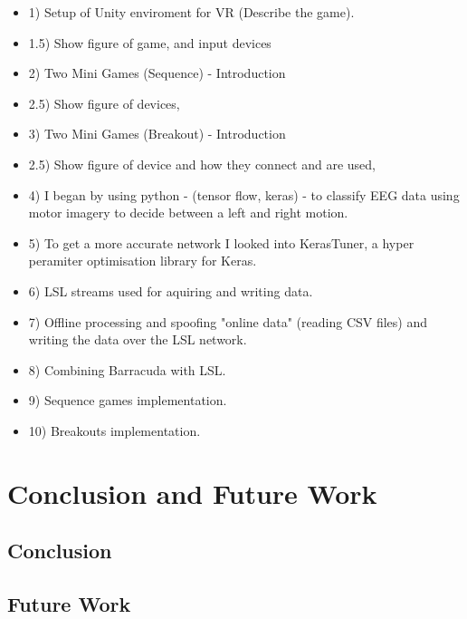 \documentclass[11pt, a4paper]{article}
\begin{document}
\break
\begin{itemize}
  \item 1)	Setup of Unity enviroment for VR (Describe the game).
  \item 1.5) Show figure of game, and input devices
  \item 2)	Two Mini Games (Sequence) - Introduction
  \item 2.5) Show figure of devices,
  \item 3)	Two Mini Games (Breakout) - Introduction
  \item 2.5) Show figure of device and how they connect and are used,
  \item 4)	I began by using python - (tensor flow, keras) - to classify EEG data using motor imagery to decide between a left and right motion.
  \item 5)	To get a more accurate network I looked into KerasTuner, a hyper peramiter optimisation library for Keras.
  \item 6)	LSL streams used for aquiring and writing data.
  \item 7)	Offline processing and spoofing "online data" (reading CSV files) and writing the data over the LSL network.
  \item 8)	Combining Barracuda with LSL.
  \item 9)	Sequence games implementation.
  \item 10)	Breakouts implementation.
\end{itemize}


\pagebreak
\section{Conclusion and Future Work}

\subsection{Conclusion}

\subsection{Future Work}			%




\pagebreak
\printbibliography
\end{document}
